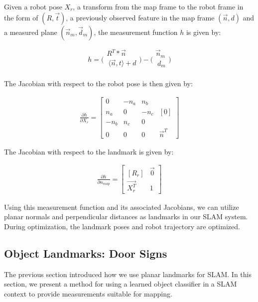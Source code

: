 \documentclass{tADR2e}
\begin{document}
Given a robot pose $X_r$, a transform from the map frame to the robot frame in the form of $(R, \vec{t})$, a previously
observed feature in the map frame $(\vec{n}, d)$ and a measured plane $(\vec{n}_m , \vec{d}_m )$, the measurement function $h$ is given by:

$$h=\bigg(
\begin{array}{c}
R^T*\vec{n}\\
\ \langle \vec{n},t\rangle + d \\
\end{array}
\bigg) -
\bigg(
\begin{array}{c}
\vec{n}_m\\
\ d_m\\
\end{array}
\bigg)
$$

The Jacobian with respect to the robot pose is then given by:

\begin{align}
\frac{\partial h}{\partial X_r}
 =
\begin{bmatrix} 
 0 & -n_a & n_b\\
 n_a & 0 & -n_c & [0]\\
 -n_b & n_c & 0\\
 0 & 0 & 0 & \vec{n}^T
\end{bmatrix}
\end{align}

The Jacobian with respect to the landmark is given by:

\begin{align}
\frac{\partial h}{\partial n_{map}}
 =
\begin{bmatrix} 
 [R_r] & \vec{0}\\
 \vec{X_r^T} & 1
\end{bmatrix}
\end{align}

Using this measurement function and its associated Jacobians, we can utilize planar normals and perpendicular distances as landmarks in our SLAM system. During
optimization, the landmark poses and robot trajectory are optimized.

\subsection{Object Landmarks: Door Signs}
\label{sec:door_signs}

The previous section introduced how we use planar landmarks for SLAM. In this section, we present a method for using a learned object classifier in a SLAM context to provide measurements suitable for mapping.
\end{document}
